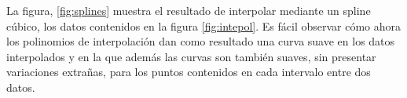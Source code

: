 






    



\begin{paracol}{2}
 La figura, \ref{fig:splines} muestra el resultado de interpolar mediante un spline cúbico, los datos contenidos en la figura \ref{fig:intepol}. Es fácil observar cómo ahora los polinomios de interpolación dan como resultado una curva suave en los datos interpolados y en la que además las curvas son también suaves, sin presentar variaciones extrañas, para los puntos contenidos en cada intervalo entre dos datos.
\end{paracol}

